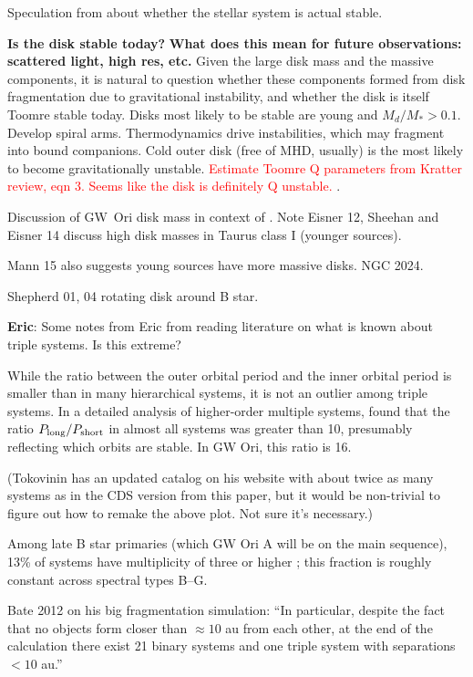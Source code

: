 \documentclass[twocolumn]{aastex61}
\newcommand{\todo}[1]{ \textcolor{red}{#1}}
\begin{document}
Speculation from \citet{berger11} about whether the stellar system is actual stable.


\textbf{Is the disk stable today?}
\textbf{What does this mean for future observations: scattered light, high res, etc.}
Given the large disk mass and the massive components, it is natural to question whether these components formed from disk fragmentation due to gravitational instability, and whether the disk is itself Toomre stable today. Disks most likely to be stable are young and $M_d/M_\ast > 0.1$. Develop spiral arms. Thermodynamics drive instabilities, which may fragment into bound companions. Cold outer disk (free of MHD, usually) is the most likely to become gravitationally unstable. \todo{Estimate Toomre Q parameters from Kratter review, eqn 3. Seems like the disk is definitely Q unstable.} \citet{kratter16}.

Discussion of GW~Ori disk mass in context of \citet{andrews13}. Note Eisner 12, Sheehan and Eisner 14 discuss high disk masses in Taurus class I (younger sources).

Mann 15 also suggests young sources have more massive disks. NGC 2024.

Shepherd 01, 04 rotating disk around B star.



\textbf{Eric}: Some notes from Eric from reading literature on what is known about triple systems.  Is this extreme?

While the ratio between the outer orbital period and the inner orbital period is smaller than in many hierarchical systems, it is not an outlier among triple systems.  In a detailed analysis of higher-order multiple systems, \citet{tokovinin97} found that the ratio $P_\mathrm{long} / P_{\rm short}$ in almost all systems was greater than 10, presumably reflecting which orbits are stable.  In GW Ori, this ratio is 16.

(Tokovinin has an updated catalog on his website with about twice as many systems as in the CDS version from this paper, but it would be non-trivial to figure out how to remake the above plot.  Not sure it's necessary.)

Among late B star primaries (which GW Ori A will be on the main sequence), 13\% of systems have multiplicity of three or higher \citep{eggleton08}; this fraction is roughly constant across spectral types B--G.


Bate 2012 on his big fragmentation simulation: ``In particular, despite the fact that no objects form closer than $\approx 10$ au from each other, at the end of the calculation there exist 21 binary systems and one triple system with separations $<10$ au.''
\end{document}
